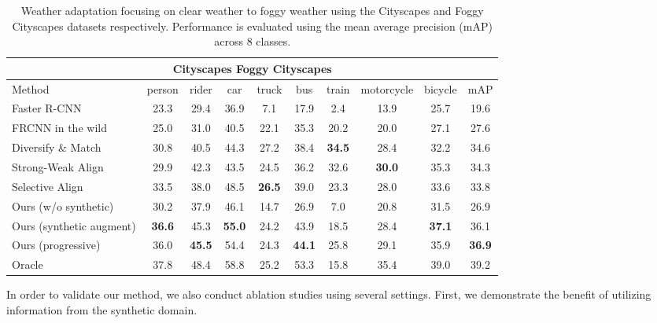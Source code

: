 \documentclass[10pt,twocolumn,letterpaper]{article}
\begin{document}
\begingroup
\renewcommand{\arraystretch}{1}
\begin{table*}[t]
\begin{center}
\caption{
Weather adaptation focusing on clear weather to foggy weather using the Cityscapes and Foggy Cityscapes datasets respectively.
Performance is evaluated using the mean average precision (mAP) across 8 classes.
}
\vspace{1mm}
\label{tab:C_F}
\begin{tabular}{lccccccccc}
                \toprule
                                         \multicolumn{10}{c}{Cityscapes  Foggy Cityscapes} \\
                \midrule
                Method & person & rider & car & truck & bus & train & motorcycle & bicycle & mAP \\
                \midrule
                Faster R-CNN  &23.3& 29.4& 36.9& 7.1& 17.9& 2.4& 13.9& 25.7& 19.6 \\
                \midrule
                FRCNN in the wild \cite{chen2018domain} & 25.0& 31.0& 40.5& 22.1& 35.3& 20.2& 20.0& 27.1& 27.6 \\
                Diversify \& Match \cite{kim2019diversify} & 30.8&40.5 & 44.3& 27.2& 38.4& \textbf{34.5}& 28.4& 32.2& 34.6\\
                Strong-Weak Align \cite{Saito_2019_CVPR} & 29.9& 42.3& 43.5& 24.5& 36.2& 32.6& \textbf{30.0}& 35.3& 34.3\\
                Selective Align \cite{Zhu_2019_CVPR} & 33.5& 38.0& 48.5& \textbf{26.5}& 39.0& 23.3& 28.0& 33.6& 33.8\\
                Ours (w/o synthetic)    & 30.2& 37.9& 46.1& 14.7& 26.9& 7.0& 20.8& 31.5& 26.9\\
                Ours (synthetic augment)   & \textbf{36.6}& 45.3& \textbf{55.0}& 24.2& 43.9& 18.5& 28.4& \textbf{37.1}& 36.1\\
Ours (progressive) & 36.0& \textbf{45.5}& 54.4& 24.3 & \textbf{44.1}& 25.8& 29.1& 35.9& \textbf{36.9}   \\        
			   \midrule
			   Oracle & 37.8& 48.4& 58.8& 25.2& 53.3& 15.8& 35.4& 39.0& 39.2\\
			   \bottomrule
\end{tabular}
\end{center}
\vspace{-7.5mm}
\end{table*}
\endgroup
In order to validate our method, we also conduct ablation studies using several settings.
First, we demonstrate the benefit of utilizing information from the synthetic domain.
\end{document}
